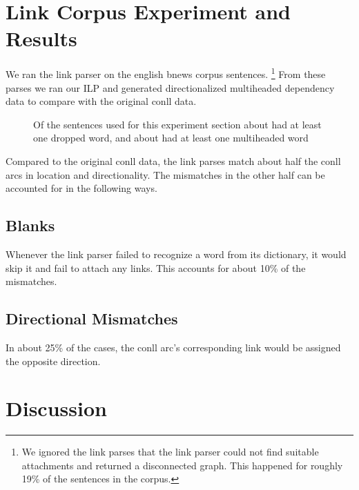 \documentclass[11pt]{article}
\begin{document}




\section{Link Corpus Experiment and Results}
We ran the link parser on the english bnews corpus sentences. \footnote{We ignored the link parses that the link parser could not find suitable attachments and returned a disconnected graph. This happened for roughly 19\% of the sentences in the corpus.} 
From these parses we ran our ILP and generated directionalized multiheaded dependency data to compare with the original conll data.

\begin{figure}[ht!]
  \centering
  \small
  
  \caption{\small Of the sentences used for this experiment section about had at least one dropped word, and about had at least one multiheaded word}
\end{figure}



Compared to the original conll data, the link parses match about half the conll arcs in location and directionality. The mismatches in the other half can be accounted for in the following ways.

\subsection{Blanks}
Whenever the link parser failed to recognize a word from its dictionary, it would skip it and fail to attach any links. This accounts for about 10\% of the mismatches.

\subsection{Directional Mismatches}
In about 25\% of the cases, the conll arc's corresponding link would be assigned the opposite direction.


\section{Discussion}
\end{document}
